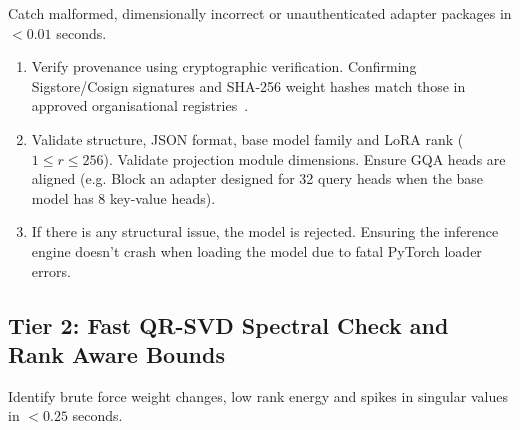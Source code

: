 \documentclass[conference]{IEEEtran}
\begin{document}
Catch malformed, dimensionally incorrect or unauthenticated adapter packages in $< 0.01$ seconds.
\begin{enumerate}
    \item Verify provenance using cryptographic verification. Confirming Sigstore/Cosign signatures and SHA-256 weight hashes match those in approved organisational registries~\cite{openssf2022sigstore}.
    \item Validate structure, JSON format, base model family and LoRA rank ($1 \le r \le 256$). Validate projection module dimensions. Ensure GQA heads are aligned (e.g. Block an adapter designed for 32 query heads when the base model has 8 key-value heads).
    \item If there is any structural issue, the model is rejected. Ensuring the inference engine doesn't crash when loading the model due to fatal PyTorch loader errors.
\end{enumerate}

\subsection{Tier 2: Fast QR-SVD Spectral Check and Rank Aware Bounds}
\label{subsec:tier2}

Identify brute force weight changes, low rank energy and spikes in singular values in $< 0.25$ seconds.
\end{document}
